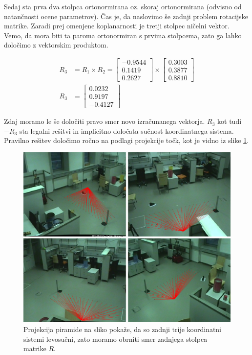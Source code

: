 \documentclass[a4paper, 12pt]{book}
\begin{document}
Sedaj sta prva dva stolpca ortonormirana oz. skoraj ortonormirana (odvisno od natančnosti ocene parametrov). Čas je, da naslovimo še zadnji problem rotacijske matrike. Zaradi prej omenjene koplanarnosti je tretji stolpec ničelni vektor. Vemo, da mora biti ta paroma ortonormiran s prvima stolpcema, zato ga lahko določimo z vektorskim produktom.

\begin{align}
R_3 &= R_1 \times R_2 =
\begin{bmatrix}
-0.9544 \\
0.1419 \\
0.2627
\end{bmatrix}
\times
\begin{bmatrix}
0.3003 \\
0.3877 \\
0.8810
\end{bmatrix} \\
R_3 &= 
\begin{bmatrix}
0.0232 \\
0.9197 \\
-0.4127
\end{bmatrix}
\end{align}

Zdaj moramo le še določiti pravo smer novo izračunanega vektorja. $R_3$ kot tudi $-R_3$ sta legalni rešitvi in implicitno določata sučnost koordinatnega sistema. Pravilno rešitev določimo ročno na podlagi projekcije točk, kot je vidno iz slike \ref{reprojectionwrongimg}.

\begin{figure}[H]
\centering
\includegraphics[scale=0.25]{reprojection_wrong.png}
\caption{Projekcija piramide na sliko pokaže, da so zadnji trije koordinatni sistemi levosučni, zato moramo obrniti smer zadnjega stolpca matrike $R$.}
\label{reprojectionwrongimg}
\end{figure}
\end{document}
